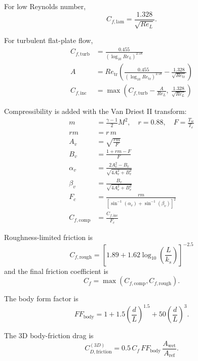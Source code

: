 \documentclass[11pt]{article}
\begin{document}
For low Reynolds number,
\begin{equation*}
C_{f,\mathrm{lam}} = \frac{1.328}{\sqrt{Re_L}}.
\end{equation*}

For turbulent flat-plate flow,
\begin{align*}
C_{f,\mathrm{turb}} &= \frac{0.455}{(\log_{10} Re_L)^{2.58}} \\
A &= Re_{\mathrm{tr}}\left(\frac{0.455}{(\log_{10} Re_{\mathrm{tr}})^{2.58}} - \frac{1.328}{\sqrt{Re_{\mathrm{tr}}}}\right) \\
C_{f,\mathrm{inc}} &= \max\!\left(C_{f,\mathrm{turb}} - \frac{A}{Re_L},\ \frac{1.328}{\sqrt{Re_L}}\right)
\end{align*}

Compressibility is added with the Van Driest II transform:
\begin{align*}
m &= \frac{\gamma-1}{2}M^2,\quad r=0.88,\quad F=\frac{T_w}{T_e} \\
rm &= r\,m \\
A_v &= \sqrt{\frac{rm}{F}} \\
B_v &= \frac{1+rm-F}{F} \\
\alpha_v &= \frac{2A_v^2-B_v}{\sqrt{4A_v^2+B_v^2}} \\
\beta_v &= \frac{B_v}{\sqrt{4A_v^2+B_v^2}} \\
F_c &= \frac{rm}{\left[\sin^{-1}(\alpha_v)+\sin^{-1}(\beta_v)\right]^2} \\
C_{f,\mathrm{comp}} &= \frac{C_{f,\mathrm{inc}}}{F_c}
\end{align*}

Roughness-limited friction is
\begin{equation*}
C_{f,\mathrm{rough}} = \left[1.89 + 1.62\log_{10}\!\left(\frac{L}{k_s}\right)\right]^{-2.5}
\end{equation*}
and the final friction coefficient is
\begin{equation*}
C_f = \max(C_{f,\mathrm{comp}}, C_{f,\mathrm{rough}}).
\end{equation*}

The body form factor is
\begin{equation*}
FF_{\mathrm{body}} = 1 + 1.5\left(\frac{d}{L}\right)^{1.5} + 50\left(\frac{d}{L}\right)^3.
\end{equation*}

The 3D body-friction drag is
\begin{equation*}
C_{D,\mathrm{friction}}^{(3D)} = 0.5\,C_f\,FF_{\mathrm{body}}\,\frac{A_{\mathrm{wet}}}{A_{\mathrm{ref}}}.
\end{equation*}
\end{document}
